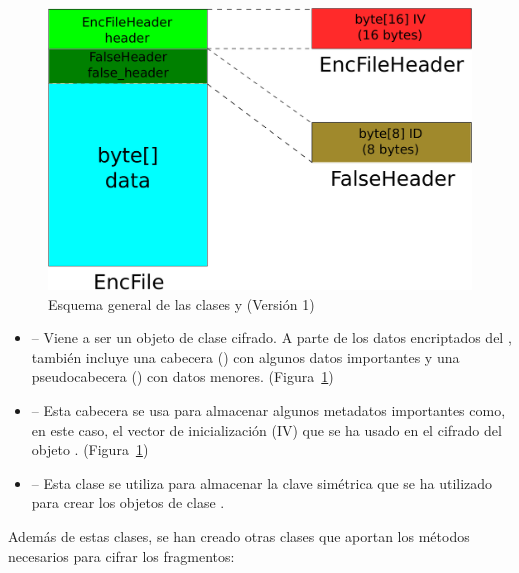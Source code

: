 \begin{figure}[!htb]
  \centering
  \includegraphics[scale=0.4]{Figures/EncFile_Header_1}
  \decoRule
  \caption[ -  (Versión 1)]{Esquema general de las clases  y  (Versión 1)}
  \label{fig:EncFile_Header_1}
\end{figure}

\begin{itemize}
  \item {} -- Viene a ser un objeto de clase  cifrado. A parte de los datos encriptados del , también incluye una cabecera () con algunos datos importantes y una pseudocabecera () con datos menores. (Figura~\ref{fig:EncFile_Header_1})

  \item {} -- Esta cabecera se usa para almacenar algunos metadatos importantes como, en este caso, el vector de inicialización (IV) que se ha usado en el cifrado del objeto . (Figura~\ref{fig:EncFile_Header_1})

  \item {} -- Esta clase se utiliza para almacenar la clave simétrica que se ha utilizado para crear los objetos de clase .
\end{itemize}

Además de estas clases, se han creado otras clases que aportan los métodos necesarios para cifrar los fragmentos:

